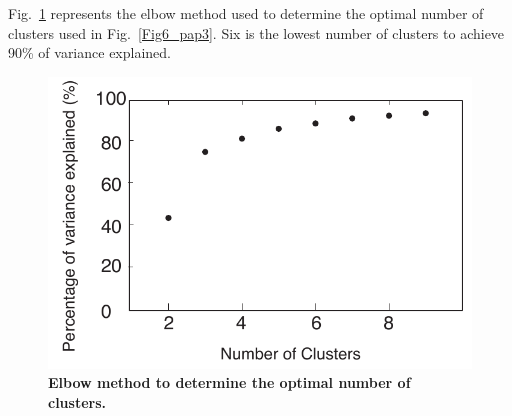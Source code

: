 Fig.~\ref{figS5_AppA} represents the elbow method used to determine the optimal number of clusters used in Fig.~\ref{Fig6_pap3}. Six is the lowest number of clusters to achieve 90\% of variance explained.



\begin{figure}[h!]
  \centering
  \includegraphics[width=5in]{paper3/FigS5.pdf}
  \caption{\textbf{Elbow method to determine the optimal number of clusters.}}
  \label{figS5_AppA}
\end{figure}



